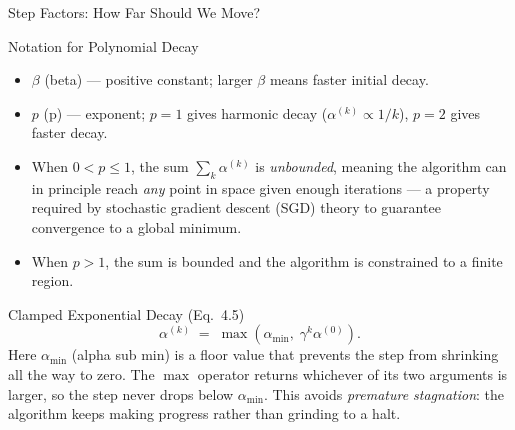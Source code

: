 \documentclass[aspectratio=169,10pt]{beamer}
\begin{document}
\begin{frame}[allowframebreaks]{Step Factors: How Far Should We Move?}
  \begin{block}{Notation for Polynomial Decay}
    \begin{itemize}
      \item $\beta$ (beta) --- positive constant; larger $\beta$ means
            faster initial decay.
      \item $p$ (p) --- exponent; $p=1$ gives harmonic decay
            ($\alpha^{(k)} \propto 1/k$), $p=2$ gives faster decay.
      \item When $0 < p \le 1$, the sum $\sum_k \alpha^{(k)}$ is
            \emph{unbounded}, meaning the algorithm can in principle
            reach \emph{any} point in space given enough iterations ---
            a property required by stochastic gradient descent (SGD)
            theory to guarantee convergence to a global minimum.
      \item When $p > 1$, the sum is bounded and the algorithm is
            constrained to a finite region.
    \end{itemize}
  \end{block}

  \begin{block}{Clamped Exponential Decay (Eq.\ 4.5)}
    \[
      \alpha^{(k)} \;=\; \max\!\left(\alpha_{\min},\; \gamma^k \alpha^{(0)}\right).
    \]
    Here $\alpha_{\min}$ (alpha sub min) is a floor value that prevents
    the step from shrinking all the way to zero.  The $\max$ operator
    returns whichever of its two arguments is larger, so the step never
    drops below $\alpha_{\min}$.  This avoids \emph{premature stagnation}:
    the algorithm keeps making progress rather than grinding to a halt.
  \end{block}

\end{frame}
\end{document}
